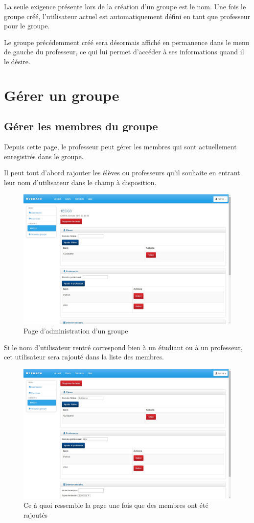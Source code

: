 \documentclass[a4paper,10pt,french]{sphinxmanual}
\begin{document}
La seule exigence présente lors de la création d'un groupe est le nom. Une fois
le groupe créé, l'utilisateur actuel est automatiquement défini en tant que
professeur pour le groupe.

Le groupe précédemment créé sera désormais affiché en permanence dans le menu
de gauche du professeur, ce qui lui permet d'accéder à ses informations quand
il le désire.


\section{Gérer un groupe}
\label{dashboard:gerer-un-groupe}

\subsection{Gérer les membres du groupe}
\label{dashboard:gerer-les-membres-du-groupe}
Depuis cette page, le professeur peut gérer les membres qui sont actuellement
enregistrés dans le groupe.

Il peut tout d'abord rajouter les élèves ou professeurs qu'il souhaite en
entrant leur nom d'utilisateur dans le champ à disposition.
\begin{figure}[htbp]
\centering
\capstart

\includegraphics[width=0.500\linewidth]{class.jpg}
\caption{Page d'administration d'un groupe}\end{figure}

Si le nom d'utilisateur rentré correspond bien à un étudiant ou à un professeur,
cet utilisateur sera rajouté dans la liste des membres.
\begin{figure}[htbp]
\centering
\capstart

\includegraphics[width=0.500\linewidth]{classAjouterMembres.jpg}
\caption{Ce à quoi ressemble la page une fois que des membres ont été rajoutés}\end{figure}
\end{document}
